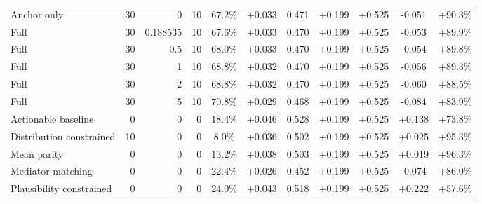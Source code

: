 \begin{table}[htbp]
\begin{tabular}{lrrrccccccc}
Anchor only & 30 & 0 & 10 & 67.2\% & +0.033 & 0.471 & +0.199 & +0.525 & -0.051 & +90.3\% \\
Full & 30 & 0.188535 & 10 & 67.6\% & +0.033 & 0.470 & +0.199 & +0.525 & -0.053 & +89.9\% \\
Full & 30 & 0.5 & 10 & 68.0\% & +0.033 & 0.470 & +0.199 & +0.525 & -0.054 & +89.8\% \\
Full & 30 & 1 & 10 & 68.8\% & +0.032 & 0.470 & +0.199 & +0.525 & -0.056 & +89.3\% \\
Full & 30 & 2 & 10 & 68.8\% & +0.032 & 0.470 & +0.199 & +0.525 & -0.060 & +88.5\% \\
Full & 30 & 5 & 10 & 70.8\% & +0.029 & 0.468 & +0.199 & +0.525 & -0.084 & +83.9\% \\
Actionable baseline & 0 & 0 & 0 & 18.4\% & +0.046 & 0.528 & +0.199 & +0.525 & +0.138 & +73.8\% \\
Distribution constrained & 10 & 0 & 0 & 8.0\% & +0.036 & 0.502 & +0.199 & +0.525 & +0.025 & +95.3\% \\
Mean parity & 0 & 0 & 0 & 13.2\% & +0.038 & 0.503 & +0.199 & +0.525 & +0.019 & +96.3\% \\
Mediator matching & 0 & 0 & 0 & 22.4\% & +0.026 & 0.452 & +0.199 & +0.525 & -0.074 & +86.0\% \\
Plausibility constrained & 0 & 0 & 0 & 24.0\% & +0.043 & 0.518 & +0.199 & +0.525 & +0.222 & +57.6\% \\
\bottomrule
\end{tabular}
\end{table}